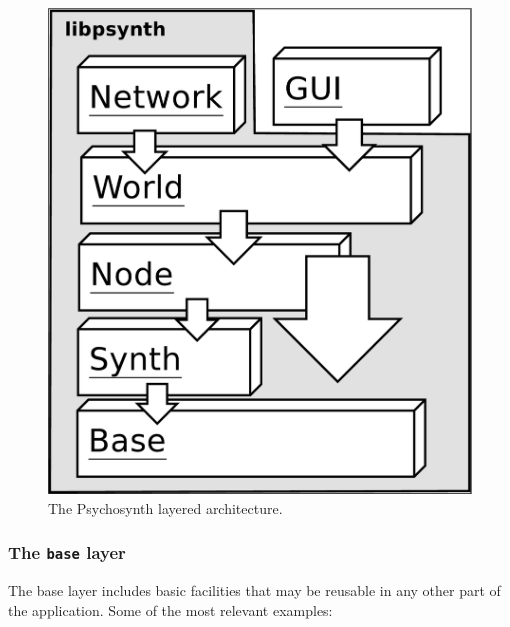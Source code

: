 \begin{figure}[h!]\centering
{}
\includegraphics[width=.6\textwidth]{pic/layers.png}
\caption{The Psychosynth layered architecture.}
\label{fig:layers}
\end{figure}

\subsubsection{The \texttt{base} layer}

The base layer includes basic facilities that may be reusable in any
other part of the application. Some of the most relevant examples:

